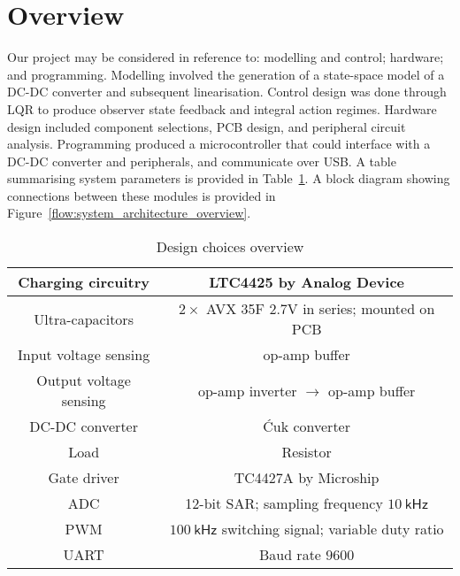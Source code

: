 \section{Overview}
Our project may be considered in reference to: modelling and control; hardware; and programming. Modelling involved the generation of a state-space model of a DC-DC converter and subsequent linearisation. Control design was done through LQR to produce observer state feedback and integral action regimes. Hardware design included component selections, PCB design, and peripheral circuit analysis. Programming produced a microcontroller that could interface with a DC-DC converter and peripherals, and communicate over USB.
\newpar
A table summarising system parameters is provided in Table~\ref{tab:overview}. A block diagram showing connections between these modules is provided in Figure~\ref{flow:system_architecture_overview}.
\begin{table}[H]
    \centering
    \begin{tabular}{|c|c|}
    \hline
    Charging circuitry & LTC4425 by Analog Device\\
    \hline
    Ultra-capacitors & $2 \times$ AVX 35F 2.7V in series; mounted on PCB\\
    \hline
    Input voltage sensing & op-amp buffer\\
    \hline
    Output voltage sensing & op-amp inverter $\rightarrow$ op-amp buffer\\
    \hline
    DC-DC converter & \'{C}uk converter\\
    \hline
    Load & Resistor\\
    \hline
    Gate driver & TC4427A by Microship\\
    \hline
    ADC & 12-bit SAR; sampling frequency $10 \ \mathsf{kHz}$\\
    \hline
    PWM & $100 \ \mathsf{kHz}$ switching signal; variable duty ratio\\
    \hline
    UART & Baud rate $9600$\\
    \hline
    \end{tabular}
    \caption{Design choices overview}
    \label{tab:overview}
\end{table}
